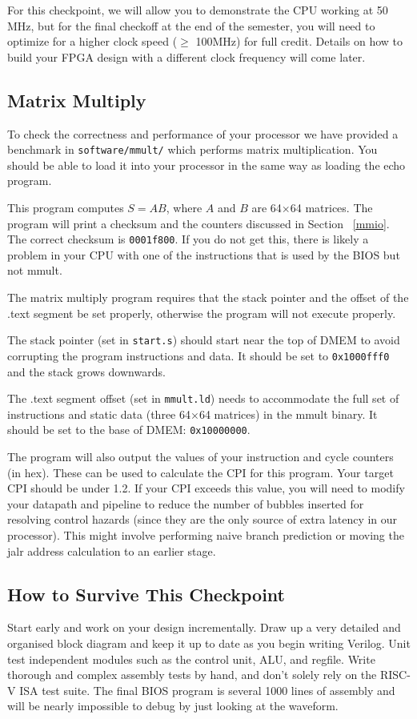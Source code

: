 \documentclass[11pt]{article}
\begin{document}
For this checkpoint, we will allow you to demonstrate the CPU working at 50 MHz, but for the final checkoff at the end of the semester, you will need to optimize for a higher clock speed ($\geq$ 100MHz) for full credit.
Details on how to build your FPGA design with a different clock frequency will come later.

\subsection{Matrix Multiply}
\label{mmult}
To check the correctness and performance of your processor we have provided a benchmark in \verb|software/mmult/| which performs matrix multiplication.
You should be able to load it into your processor in the same way as loading the echo program.

This program computes $S=AB$, where $A$ and $B$ are 64$\times$64 matrices.
The program will print a checksum and the counters discussed in Section ~\ref{mmio}.
The correct checksum is \verb|0001f800|.
If you do not get this, there is likely a problem in your CPU with one of the instructions that is used by the BIOS but not mmult.

The matrix multiply program requires that the stack pointer and the offset of the .text segment be set properly, otherwise the program will not execute properly.

The stack pointer (set in \verb|start.s|) should start near the top of DMEM to avoid corrupting the program instructions and data.
It should be set to \verb|0x1000fff0| and the stack grows downwards.

The .text segment offset (set in \verb|mmult.ld|) needs to accommodate the full set of instructions and static data (three 64$\times$64 matrices) in the mmult binary.
It should be set to the base of DMEM: \verb|0x10000000|.

The program will also output the values of your instruction and cycle counters (in hex).
These can be used to calculate the CPI for this program.
Your target CPI should be under 1.2.
If your CPI exceeds this value, you will need to modify your datapath and pipeline to reduce the number of bubbles inserted for resolving control hazards (since they are the only source of extra latency in our processor).
This might involve performing naive branch prediction or moving the jalr address calculation to an earlier stage.

\subsection{How to Survive This Checkpoint}
Start early and work on your design incrementally.
Draw up a very detailed and organised block diagram and keep it up to date as you begin writing Verilog.
Unit test independent modules such as the control unit, ALU, and regfile.
Write thorough and complex assembly tests by hand, and don't solely rely on the RISC-V ISA test suite.
The final BIOS program is several 1000 lines of assembly and will be nearly impossible to debug by just looking at the waveform.
\end{document}
